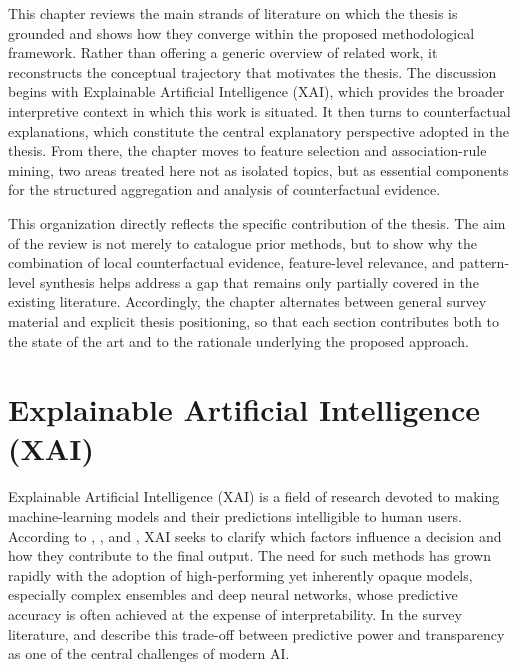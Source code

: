 
This chapter reviews the main strands of literature on which the thesis is grounded and shows how they converge within the proposed methodological framework. Rather than offering a generic overview of related work, it reconstructs the conceptual trajectory that motivates the thesis. The discussion begins with Explainable Artificial Intelligence (XAI), which provides the broader interpretive context in which this work is situated. It then turns to counterfactual explanations, which constitute the central explanatory perspective adopted in the thesis. From there, the chapter moves to feature selection and association-rule mining, two areas treated here not as isolated topics, but as essential components for the structured aggregation and analysis of counterfactual evidence.

This organization directly reflects the specific contribution of the thesis. The aim of the review is not merely to catalogue prior methods, but to show why the combination of local counterfactual evidence, feature-level relevance, and pattern-level synthesis helps address a gap that remains only partially covered in the existing literature. Accordingly, the chapter alternates between general survey material and explicit thesis positioning, so that each section contributes both to the state of the art and to the rationale underlying the proposed approach.

\section{Explainable Artificial Intelligence (XAI)}
Explainable Artificial Intelligence (XAI) is a field of research devoted to making machine-learning models and their predictions intelligible to human users. According to \textcite{adadi2018peeking}, \textcite{arrieta2020explainable}, and \textcite{molnar2022iml}, XAI seeks to clarify which factors influence a decision and how they contribute to the final output. The need for such methods has grown rapidly with the adoption of high-performing yet inherently opaque models, especially complex ensembles and deep neural networks, whose predictive accuracy is often achieved at the expense of interpretability. In the survey literature, \textcite{adadi2018peeking} and \textcite{arrieta2020explainable} describe this trade-off between predictive power and transparency as one of the central challenges of modern AI.

